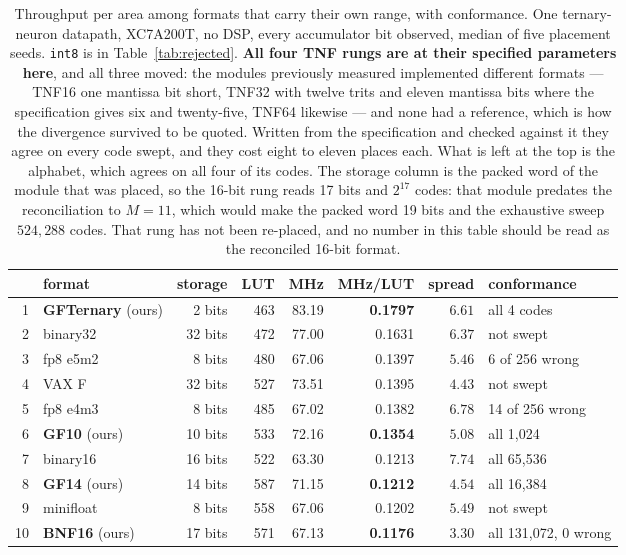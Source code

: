 \documentclass[11pt]{article}
\theoremstyle{definition}
\begin{document}
\begin{table}[t]\centering
\caption{Throughput per area among formats that carry their own range, with
conformance. One ternary-neuron datapath, XC7A200T, no DSP, every accumulator
bit observed, median of five placement seeds. \texttt{int8} is in
Table~\ref{tab:rejected}. \textbf{All four TNF rungs are at their specified
parameters here}, and all three moved: the modules previously measured
implemented different formats --- TNF16 one mantissa bit short, TNF32 with twelve
trits and eleven mantissa bits where the specification gives six and
twenty-five, TNF64 likewise --- and none had a reference, which is how the
divergence survived to be quoted. Written from the specification and checked
against it they agree on every code swept, and they cost eight to eleven places
each. What is left at the top is the alphabet, which agrees on all four of its
codes. The storage column is the packed word of the module that was placed, so the
16-bit rung reads 17 bits and $2^{17}$ codes: that module predates the
reconciliation to $M = 11$, which would make the packed word 19 bits and the
exhaustive sweep $524{,}288$ codes. That rung has not been re-placed, and no
number in this table should be read as the reconciled 16-bit format.}
\label{tab:fullthroughput}
\small
\begin{tabular}{rlrrrrrl}
\toprule
& format & storage & LUT & MHz & MHz/LUT & spread & conformance \\
\midrule
1 & \textbf{GFTernary} (ours) & 2 bits & 463 & 83.19 & \textbf{0.1797} & $6.61$ & all 4 codes \\
2 & binary32 & 32 bits & 472 & 77.00 & 0.1631 & $6.37$ & not swept \\
3 & fp8 e5m2 & 8 bits & 480 & 67.06 & 0.1397 & $5.46$ & 6 of 256 wrong \\
4 & VAX F & 32 bits & 527 & 73.51 & 0.1395 & $4.43$ & not swept \\
5 & fp8 e4m3 & 8 bits & 485 & 67.02 & 0.1382 & $6.78$ & 14 of 256 wrong \\
6 & \textbf{GF10} (ours) & 10 bits & 533 & 72.16 & \textbf{0.1354} & $5.08$ & all 1{,}024 \\
7 & binary16 & 16 bits & 522 & 63.30 & 0.1213 & $7.74$ & all 65{,}536 \\
8 & \textbf{GF14} (ours) & 14 bits & 587 & 71.15 & \textbf{0.1212} & $4.54$ & all 16{,}384 \\
9 & minifloat & 8 bits & 558 & 67.06 & 0.1202 & $5.49$ & not swept \\
10 & \textbf{BNF16} (ours) & 17 bits & 571 & 67.13 & \textbf{0.1176} & $3.30$ & all 131{,}072, 0 wrong \\

\end{tabular}
\end{table}
\end{document}
